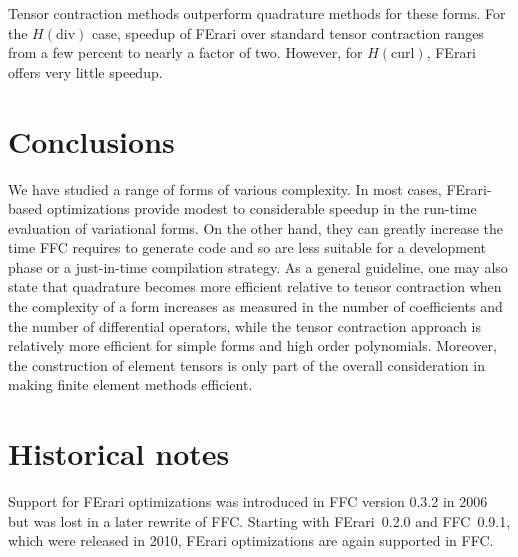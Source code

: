 Tensor contraction methods outperform quadrature methods for these
forms. For the \( H(\mathrm{div}) \) case, speedup of FErari over
standard tensor contraction ranges from a few percent to nearly a
factor of two. However, for \( H(\mathrm{curl}) \), FErari offers very
little speedup.

\section{Conclusions}

We have studied a range of forms of various complexity. In most cases,
FErari-based optimizations provide modest to considerable speedup in
the run-time evaluation of variational forms. On the other hand, they
can greatly increase the time FFC requires to generate code and so are
less suitable for a development phase or a just-in-time compilation
strategy. As a general guideline, one may also state that quadrature
becomes more efficient relative to tensor contraction when the
complexity of a form increases as measured in the number of
coefficients and the number of differential operators, while the
tensor contraction approach is relatively more efficient for simple
forms and high order polynomials. Moreover, the construction of
element tensors is only part of the overall consideration in making
finite element methods efficient.

\section{Historical notes}

Support for FErari optimizations was introduced in FFC version 0.3.2
in 2006 but was lost in a later rewrite of FFC. Starting with
FErari~0.2.0 and FFC~0.9.1, which were released in 2010, FErari
optimizations are again supported in FFC.
